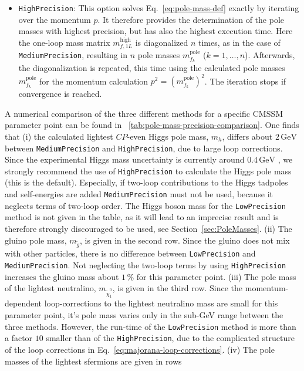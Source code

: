 \documentclass[final,3p,11pt,pdflatex]{elsarticle}
\newcommand{\code}[1]{\lstinline|#1|}  %
\newcommand{\unit}[1]{\,\text{#1}}      %
\newcommand{\pole}{\text{pole}}
\newcommand{\secref}[1]{Section~\ref{#1}}
\newcommand{\tabref}[1]{\tablename~\ref{#1}}
\begin{document}
\begin{itemize}
\item \code{HighPrecision}: This option solves
  Eq.~\eqref{eq:pole-mass-def} exactly by iterating over the momentum
  $p$.  It therefore provides the determination of the pole masses
  with highest precision, but has also the highest execution time.
  Here the one-loop mass matrix $m_{f,1L}^\text{high}$ is diagonalized
  $n$ times, as in the case of \code{MediumPrecision},
  resulting in $n$ pole masses $m_{f_k}^\pole$ ($k = 1,\ldots,n$).
  Afterwards, the diagonalization is repeated, this time using the
  calculated pole masses $m_{f_k}^\pole$ for the momentum calculation
  $p^2 = (m_{f_k}^\pole)^2$.  The iteration stops if convergence is
  reached.
\end{itemize}
%
A numerical comparison of the three different methods for a specific
CMSSM parameter point can be found in
\tabref{tab:pole-mass-precision-comparison}.  One finds that
%
(i) the calculated lightest $CP$-even Higgs pole mass, $m_h$, differs
about $2\unit{GeV}$ between \code{MediumPrecision} and
\code{HighPrecision}, due to large loop corrections.  Since the
experimental Higgs mass uncertainty is currently around
$0.4\unit{GeV}$ \cite{Beringer:1900zz}, we strongly recommend the use
of \code{HighPrecision} to calculate the Higgs pole mass (this is the
default).  Especially, if two-loop contributions to the Higgs tadpoles
and self-energies are added \code{MediumPrecision} must not be used,
because it neglects terms of two-loop order.  The Higgs boson mass for
the \code{LowPrecision} method is not given in the table, as it will
lead to an imprecise result and is therefore strongly discouraged to
be used, see \secref{sec:PoleMasses}.
%
(ii) The gluino pole mass, $m_{\tilde{g}}$, is given in the second
row.  Since the gluino does not mix with other particles, there is no
difference between \code{LowPrecision} and \code{MediumPrecision}.
Not neglecting the two-loop terms by using \code{HighPrecision}
increases the gluino mass about $1\unit{\%}$ for this parameter point.
%
(iii) The pole mass of the lightest neutralino,
$m_{\tilde{\chi}_1^0}$, is given in the third row.  Since the
momentum-dependent loop-corrections to the lightest neutralino mass
are small for this parameter point, it's pole mass varies only in the
sub-GeV range between the three methods.  However, the run-time of the
\code{LowPrecision} method is more than a factor $10$ smaller than of
the \code{HighPrecision}, due to the complicated structure of the loop
corrections in Eq.~\eqref{eq:majorana-loop-corrections}.
%
(iv) The pole masses of the lightest sfermions are given in rows
\end{document}
